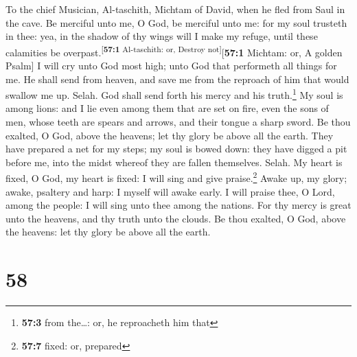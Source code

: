 To the chief Musician, Al-taschith, Michtam of David, when he fled from
Saul in the cave.  Be merciful unto me, O God, be merciful
unto me: for my soul trusteth in thee: yea, in the shadow of thy wings
will I make my refuge, until these calamities be
overpast.\textsuperscript{{[}\textbf{57:1} Al-taschith: or, Destroy
not{]}}{[}\textbf{57:1} Michtam: or, A golden Psalm{]}  I
will cry unto God most high; unto God that performeth all things for me.
 He shall send from heaven, and save me from the reproach
of him that would swallow me up. Selah. God shall send forth his mercy
and his truth.\footnote{\textbf{57:3} from the\ldots: or, he reproacheth
  him that}  My soul is among lions: and I lie even among
them that are set on fire, even the sons of men, whose teeth are spears
and arrows, and their tongue a sharp sword.  Be thou
exalted, O God, above the heavens; let thy glory be above all the earth.
 They have prepared a net for my steps; my soul is bowed
down: they have digged a pit before me, into the midst whereof they are
fallen themselves. Selah.  My heart is fixed, O God, my
heart is fixed: I will sing and give praise.\footnote{\textbf{57:7}
  fixed: or, prepared}  Awake up, my glory; awake,
psaltery and harp: I myself will awake early.  I will
praise thee, O Lord, among the people: I will sing unto thee among the
nations.  For thy mercy is great unto the heavens, and
thy truth unto the clouds.  Be thou exalted, O God, above
the heavens: let thy glory be above all the earth.

\hypertarget{section-57}{%
\section{58}\label{section-57}}

